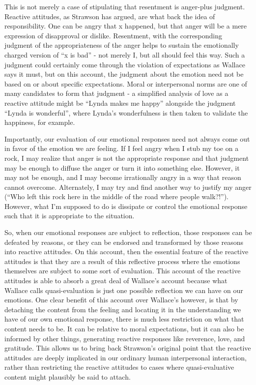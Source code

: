 \documentclass[phd,12pt,oneside,paper=letterpaper]{ubcthesis}
\begin{document}
This is not merely a case of stipulating that resentment is anger-plus judgment. Reactive attitudes, as Strawson has argued, are what back the idea of responsibility. One can be angry that x happened, but that anger will be a mere expression of disapproval or dislike. Resentment, with the corresponding judgment of the appropriateness of the anger helps to sustain the emotionally charged version of ``x is bad'' - not merely I, but all should feel this way. Such a judgment could certainly come through the violation of expectations as Wallace says it must, but on this account, the judgment about the emotion need not be based on or about specific expectations. Moral or interpersonal norms are one of many candidates to form that judgment - a simplified analysis of love as a reactive attitude might be ``Lynda makes me happy'' alongside the judgment ``Lynda is wonderful'', where Lynda's wonderfulness is then taken to validate the happiness, for example. 

Importantly, our evaluation of our emotional responses need not always come out in favor of the emotion we are feeling. If I feel angry when I stub my toe on a rock, I may realize that anger is not the appropriate response and that judgment may be enough to diffuse the anger or turn it into something else. However, it may not be enough, and I may become irrationally angry in a way that reason cannot overcome. Alternately, I may try and find another way to justify my anger (``Who left this rock here in the middle of the road where people walk?!''). However, what I'm supposed to do is dissipate or control the emotional response such that it is appropriate to the situation. 

So, when our emotional responses are subject to reflection, those responses can be defeated by reasons, or they can be endorsed and transformed by those reasons into reactive attitudes. On this account, then the essential feature of the reactive attitudes is that they are a result of this reflective process where the emotions themselves are subject to some sort of evaluation. This account of the reactive attitudes is able to absorb a great deal of Wallace's account because what Wallace calls quasi-evaluation is just one possible reflection we can have on our emotions. One clear benefit of this account over Wallace's however, is that by detaching the content from the feeling and locating it in the understanding we have of our own emotional response, there is much less restriction on what that content needs to be. It can be relative to moral expectations, but it can also be informed by other things, generating reactive responses like reverence, love, and gratitude. This allows us to bring back Strawson's original point that the reactive attitudes are deeply implicated in our ordinary human interpersonal interaction, rather than restricting the reactive attitudes to cases where quasi-evaluative content might plausibly be said to attach. 
\end{document}
